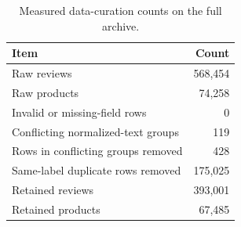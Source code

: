 \begin{table}[t]
\caption{Measured data-curation counts on the full archive.}
\label{tab:audit}
\centering\footnotesize
\begin{tabular}{@{}lr@{}}
\toprule
Item & Count\\\midrule
Raw reviews & 568,454\\
Raw products & 74,258\\
Invalid or missing-field rows & 0\\
Conflicting normalized-text groups & 119\\
Rows in conflicting groups removed & 428\\
Same-label duplicate rows removed & 175,025\\
Retained reviews & 393,001\\
Retained products & 67,485\\
\bottomrule
\end{tabular}

\end{table}
